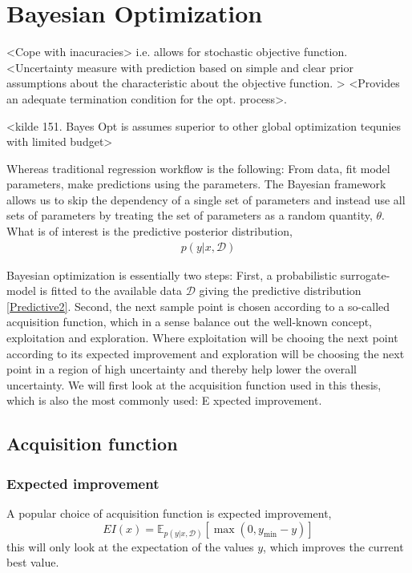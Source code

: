 \chapter{Bayesian Optimization}
<Cope with inacuracies> i.e. allows for stochastic objective function. 
<Uncertainty measure with prediction based on simple and clear prior 
assumptions about the characteristic about the objective function. >
<Provides an adequate termination condition for the opt. process>. 

<kilde 151. Bayes Opt is assumes superior to other global optimization tequnies 
with limited budget>


Whereas traditional regression workflow is the following: From data, fit model parameters, make predictions using the parameters. 
The Bayesian framework allows us to skip the dependency of a single set of parameters and instead use all sets of parameters 
by treating the set of parameters as a random quantity, $\theta$. What is of interest is the predictive posterior distribution,  
\begin{align}\label{Predictive2}
    p(y|x, \mathcal{D})
\end{align}

Bayesian optimization is essentially two steps: First, a probabilistic surrogate-model is fitted
to the available data $\mathcal{D}$ giving the predictive distribution \eqref{Predictive2}. Second,
the next sample point is chosen according to a so-called acquisition function, which in a sense
balance out the well-known concept, exploitation and exploration. Where exploitation will be chooing
the next point according to its expected improvement and exploration will be choosing the next point
in a region of high uncertainty and thereby help lower the overall uncertainty. We will first look at
the acquisition function used in this thesis, which is also the most commonly used: E   xpected improvement. 

\section{Acquisition function}

\subsection{Expected improvement}
A popular choice of acquisition function is expected improvement, 
$$EI(x) = \mathbb{E}_{p(y|x,\mathcal{D})}[\max(0, y_{\min}-y)]$$
this will only look at the expectation of the values $y$, which improves the current best value.

